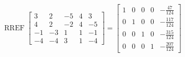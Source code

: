 \begin{exerciseAnswer} 


\[\operatorname{RREF} \left[\begin{array}{ccccc}
3 & 2 & -5 & 4 & 3 \\
4 & 2 & -2 & 4 & -5 \\
-1 & -3 & 1 & 1 & -1 \\
-4 & -4 & 3 & 1 & -4
\end{array}\right] = \left[\begin{array}{ccccc}
1 & 0 & 0 & 0 & -\frac{47}{124} \\
0 & 1 & 0 & 0 & -\frac{117}{124} \\
0 & 0 & 1 & 0 & -\frac{315}{124} \\
0 & 0 & 0 & 1 & -\frac{207}{124}
\end{array}\right] \]



\end{exerciseAnswer}
